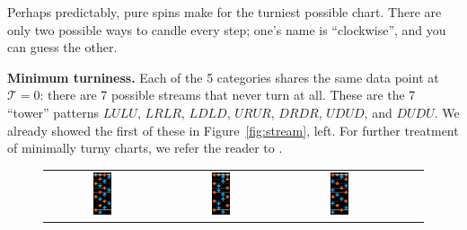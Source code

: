 \documentclass[10pt]{sigplanconf}
\begin{document}
Perhaps predictably, pure spins make for the turniest possible chart. There are only two possible ways to candle every step; one's name is ``clockwise'', and you can guess the other.

{\bf Minimum turniness.}
Each of the 5 categories shares the same data point at $\mathcal{T}=0$: there are 7 possible streams that never turn at all. These are the 7 ``tower'' patterns $LULU$, $LRLR$, $LDLD$, $URUR$, $DRDR$, $UDUD$, and $DUDU$. We already showed the first of these in Figure~\ref{fig:stream}, left. For further treatment of minimally turny charts, we refer the reader to \cite{deltamax}.

\begin{figure}[t]
	\begin{center}
	\begin{tabular}{ccccc}
		\includegraphics[width=0.17\textwidth]{result-1-3-vanilla.png} &
		\includegraphics[width=0.17\textwidth]{result-1-5-xover.png} &
		\includegraphics[width=0.17\textwidth]{result-1-6-lats.png} &

\end{tabular}
\end{center}
\end{figure}
\end{document}
